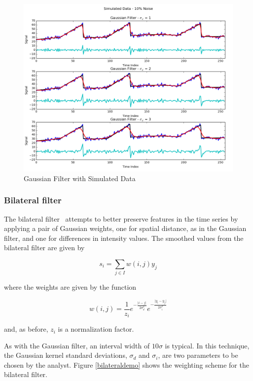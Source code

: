 \documentclass[11pt]{article}
\theoremstyle{definition}
\begin{document}
\begin{figure}[h!]
\centering
\includegraphics[width = 0.9 \textwidth]{GaussianCompare.png}
\caption{Gaussian Filter with Simulated Data}
\label{gaussiancompare}
\end{figure}

\FloatBarrier


\subsubsection{Bilateral filter} 
The bilateral filter~\cite{tomasi98:bilateral} attempts to better
preserve features in the time series by applying a pair of Gaussian
weights, one for spatial distance, as in the Gaussian filter, and one
for differences in intensity values. The smoothed values from the
bilateral filter are given by

\begin{displaymath}
s_i = \sum _{j \in I} w \left(i, j \right) y_j
\end{displaymath}

\noindent
where the weights are given by the function

\begin{displaymath}
w\left(i, j\right) = \frac{1}{z_i} e^{-\frac{\lvert i - j \rvert}{2 \sigma_d^2}}e^{-\frac{\lvert y_i - y_j \rvert}{2 \sigma_i^2}}
\end{displaymath}

\noindent
and, as before, $z_i$ is a normalization factor.

As with the Gaussian filter, an interval width of $10 \sigma$ is typical. In this
technique, the Gaussian kernel standard deviations, $\sigma_d$ and
$\sigma_i$, are two parameters to be chosen by the analyst. Figure
\ref{bilateraldemo} shows the weighting scheme for the bilateral
filter.
\end{document}

